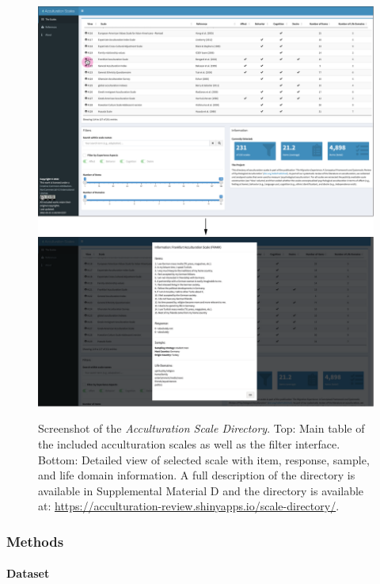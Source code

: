 \begin{figure}[ht!]
  \centering
  \caption{Screenshot of the \textit{Acculturation Scale Directory}. Top: Main table of the included acculturation scales as well as the filter interface. Bottom: Detailed view of selected scale with item, response, sample, and life domain information. A full description of the directory is available in Supplemental Material D and the directory is available at: \href{https://acculturation-review.shinyapps.io/scale-directory/}{https://acculturation-review.shinyapps.io/scale-directory/}.}
  \includegraphics[width=\textwidth]{Figures/AcculturationDIrectoryScreenshot.pdf}
  \label{fig:DirectoryScreen}
\end{figure}

\subsubsection{Methods}  
\paragraph{Dataset}

